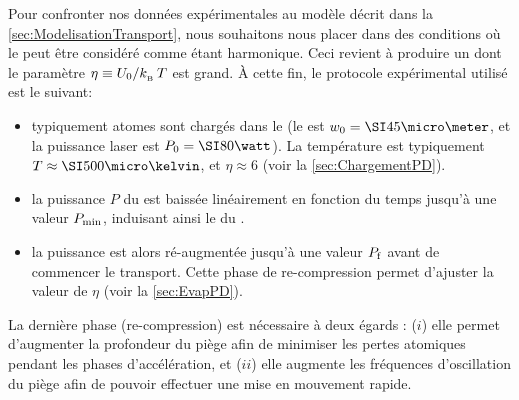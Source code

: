 Pour confronter nos données expérimentales au modèle décrit dans la \autoref{sec:ModelisationTransport}, nous souhaitons nous placer dans des conditions où le \pd peut être considéré comme étant harmonique. Ceci revient à produire un \nat dont le paramètre $\eta\equiv{{{{U_0}}} / {{k_{_{\rm B}}}\,T}}$ est grand.
\`A cette fin, le protocole expérimental utilisé est le suivant:
\begin{itemize}
	\item typiquement  atomes sont chargés dans le \pd (le \waist est $\wzero=\micron{45}$, et la puissance laser est $P_0=\W{80}$). La température est typiquement $T\approx\microK{500}$, et $\eta\approx6$ (voir la \autoref{sec:ChargementPD}).
	\item la puissance $P$ du \ldp est baissée linéairement en fonction du temps jusqu'à une valeur ${P_{\rm min}}$, induisant ainsi le \rpef du \n.
	\item la puissance est alors ré-augmentée jusqu'à une valeur ${P_{\rm f}}$ avant de commencer le transport. Cette phase de re-compression permet d'ajuster la valeur de $\eta$ (voir la \autoref{sec:EvapPD}).
\end{itemize}
La dernière phase (re-compression) est nécessaire à deux égards : ($i$) elle permet d'augmenter la profondeur du piège afin de minimiser les pertes atomiques pendant les phases d'accélération, et ($ii$) elle augmente les fréquences d'oscillation du piège afin de pouvoir effectuer une mise en mouvement rapide.

